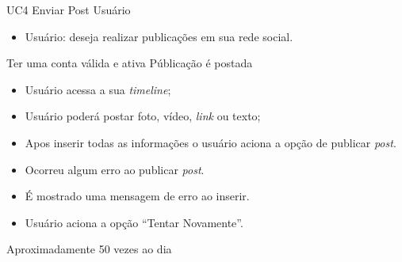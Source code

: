 \casoDeUso
{UC4}
{Enviar Post}
{Usuário}
{
\begin{itemize}
	\item Usuário: deseja realizar publicações em sua rede social.
\end{itemize}

}
{Ter uma conta válida e ativa}
{Públicação é postada}
{
\begin{itemize}
\item Usuário acessa a sua \textit{timeline};
\item Usuário poderá postar foto, vídeo, \textit{link} ou texto;
\item Apos inserir todas as informações o usuário aciona a opção de publicar \textit{post}.
\end{itemize}
}
{
\begin{itemize}
\item Ocorreu algum erro ao publicar \textit{post}.
\item É mostrado uma mensagem de erro ao inserir.
\item Usuário aciona a opção “Tentar Novamente”.
\end{itemize}
}
{Aproximadamente 50 vezes ao dia}
{

}

